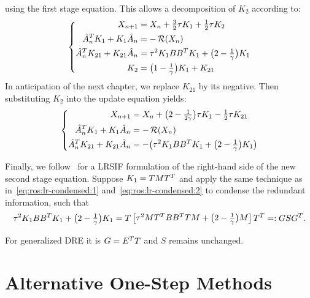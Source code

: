 using the first stage equation.
This allows a decomposition of $K_2$ according to:
\begin{equation}
\left\{
\begin{aligned}
  X_{n+1} &= X_n + \tfrac{3}{2} \tau K_1 + \tfrac{1}{2} \tau K_2 \\
  \hat A_n^T K_1 + K_1 \hat A_n &= -\operatorname{\mathcal R}(X_n) \\
  \hat A_n^T K_{21} + K_{21} \hat A_n &= \tau^2 K_1 BB^T K_1 + \big( 2-\tfrac{1}{\gamma} \big) K_1 \\
  K_2 &= \big( 1-\tfrac{1}{\gamma} \big) K_1 + K_{21}
\end{aligned}
\right.
\end{equation}
In anticipation of the next chapter, we replace $K_{21}$ by its negative.
Then substituting $K_2$ into the update equation yields:
\begin{equation}
\left\{
\begin{aligned}
  X_{n+1} &= X_n + \big( 2 - \tfrac{1}{2\gamma} \big) \tau K_1 - \tfrac{1}{2} \tau K_{21} \\
  \hat A_n^T K_1 + K_1 \hat A_n &= -\operatorname{\mathcal R}(X_n) \\
  \hat A_n^T K_{21} + K_{21} \hat A_n &= -\big( \tau^2 K_1 BB^T K_1 + \big( 2-\tfrac{1}{\gamma} \big) K_1 \big)
\end{aligned}
\right.
\end{equation}

Finally, we follow~\cite{Lang2015} for a \ac{LRSIF} formulation of the right-hand side of the new second stage equation.
Suppose $K_1 = TMT^T$ and apply the same technique as
in~\eqref{eq:ros:lr-condensed:1}
and~\eqref{eq:ros:lr-condensed:2}
to condense the redundant information,
such that
\begin{equation}
  \tau^2 K_1 BB^T K_1 + \big( 2-\tfrac{1}{\gamma} \big) K_1
  = T \begin{bmatrix}
    \tau^2 MT^T BB^T TM + \big( 2-\tfrac{1}{\gamma} \big) M
  \end{bmatrix}
  T^T
  =: GSG^T
  .
\end{equation}

\begin{remark}
  For generalized \ac{DRE} it is $G = E^T T$ and $S$ remains unchanged.
\end{remark}


\section{Alternative One-Step Methods}

